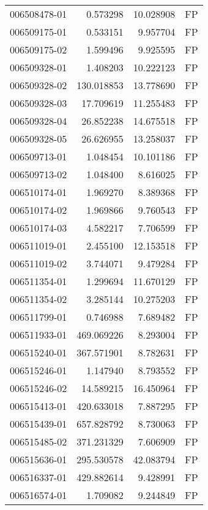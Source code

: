 \begin{tabular}{lrrl}
006508478-01 &    0.573298 &      10.028908 &   FP \\
006509175-01 &    0.533151 &       9.957704 &   FP \\
006509175-02 &    1.599496 &       9.925595 &   FP \\
006509328-01 &    1.408203 &      10.222123 &   FP \\
006509328-02 &  130.018853 &      13.778690 &   FP \\
006509328-03 &   17.709619 &      11.255483 &   FP \\
006509328-04 &   26.852238 &      14.675518 &   FP \\
006509328-05 &   26.626955 &      13.258037 &   FP \\
006509713-01 &    1.048454 &      10.101186 &   FP \\
006509713-02 &    1.048400 &       8.616025 &   FP \\
006510174-01 &    1.969270 &       8.389368 &   FP \\
006510174-02 &    1.969866 &       9.760543 &   FP \\
006510174-03 &    4.582217 &       7.706599 &   FP \\
006511019-01 &    2.455100 &      12.153518 &   FP \\
006511019-02 &    3.744071 &       9.479284 &   FP \\
006511354-01 &    1.299694 &      11.670129 &   FP \\
006511354-02 &    3.285144 &      10.275203 &   FP \\
006511799-01 &    0.746988 &       7.689482 &   FP \\
006511933-01 &  469.069226 &       8.293004 &   FP \\
006515240-01 &  367.571901 &       8.782631 &   FP \\
006515246-01 &    1.147940 &       8.793552 &   FP \\
006515246-02 &   14.589215 &      16.450964 &   FP \\
006515413-01 &  420.633018 &       7.887295 &   FP \\
006515439-01 &  657.828792 &       8.730063 &   FP \\
006515485-02 &  371.231329 &       7.606909 &   FP \\
006515636-01 &  295.530578 &      42.083794 &   FP \\
006516337-01 &  429.882614 &       9.428991 &   FP \\
006516574-01 &    1.709082 &       9.244849 &   FP \\

\end{tabular}
